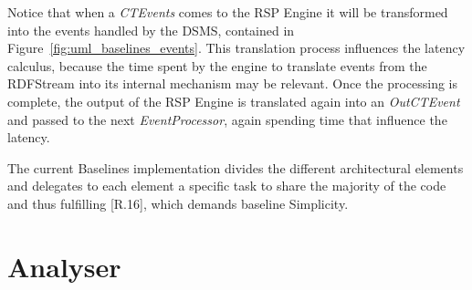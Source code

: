 Notice that when a \textit{CTEvents} comes to the RSP Engine it will be transformed into the events handled by the DSMS, contained in Figure~\ref{fig:uml_baselines_events}. This translation process influences the latency calculus, because the time spent by the engine to translate events from the RDFStream into its internal mechanism may be relevant. Once the processing is complete, the output of the RSP Engine is translated again into an \textit{OutCTEvent} and passed to the next \textit{EventProcessor}, again spending time that influence the latency.

The current Baselines implementation divides the different architectural elements and delegates to each element a specific task to share the majority of the code and thus fulfilling [R.16], which demands baseline Simplicity.

%

\pagebreak

\section{Analyser}\label{sec:analyser-impl}

